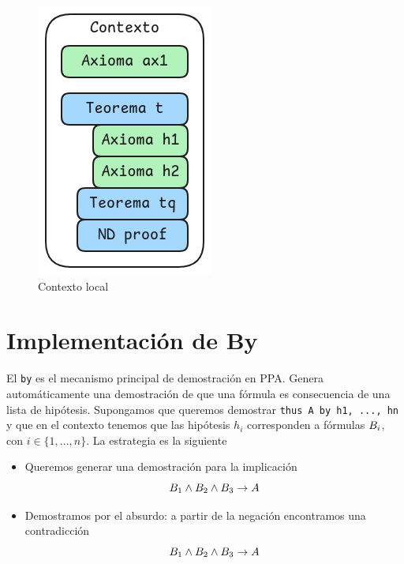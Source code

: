 \begin{figure}[H]
    \centering
    \begin{multicols}{2}
        \begin{tabular}{c}
            
        \end{tabular}
        \includegraphics[scale=0.5]{img/ppa-local-context.png}
    \end{multicols}
    \caption{Contexto local}
\end{figure}

\section{Implementación de By}

El \lstinline{by} es el mecanismo principal de demostración en PPA. Genera
automáticamente una demostración de que una fórmula es consecuencia de una lista
de hipótesis. Supongamos que queremos demostrar \lstinline{thus A by h1, ..., hn} y que en el contexto tenemos que las hipótesis $h_i$
corresponden a fórmulas $B_i$, con $i \in \{1, ..., n\}$. La estrategia es la siguiente

\begin{itemize}
    \item Queremos generar una demostración para la implicación
    \[
        B_1 \wedge B_2 \wedge B_3 \to A
    \]
    \item Demostramos por el absurdo: a partir de la negación encontramos una contradicción
    \[
        B_1 \wedge B_2 \wedge B_3 \to A
    \]
\end{itemize}

